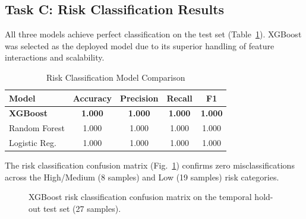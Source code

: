 \documentclass[conference]{IEEEtran}
\begin{document}
\subsection{Task C: Risk Classification Results}

All three models achieve perfect classification on the test set (Table~\ref{tab:risk}). XGBoost was selected as the deployed model due to its superior handling of feature interactions and scalability.

\begin{table}[h]
\caption{Risk Classification Model Comparison}
\label{tab:risk}
\centering
\begin{tabular}{lcccc}
\toprule
\textbf{Model} & \textbf{Accuracy} & \textbf{Precision} & \textbf{Recall} & \textbf{F1} \\
\midrule
\textbf{XGBoost} & \textbf{1.000} & \textbf{1.000} & \textbf{1.000} & \textbf{1.000} \\
Random Forest & 1.000 & 1.000 & 1.000 & 1.000 \\
Logistic Reg. & 1.000 & 1.000 & 1.000 & 1.000 \\
\bottomrule
\end{tabular}
\end{table}

The risk classification confusion matrix (Fig.~\ref{fig:risk_cm}) confirms zero misclassifications across the High/Medium (8 samples) and Low (19 samples) risk categories.

\begin{figure}[h]
\centering
{}
\caption{XGBoost risk classification confusion matrix on the temporal hold-out test set (27 samples).}
\label{fig:risk_cm}
\end{figure}
\end{document}
